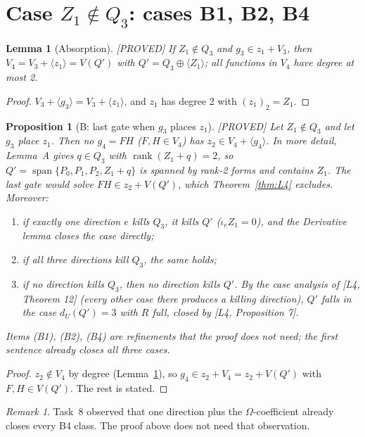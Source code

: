 \documentclass[11pt,a4paper]{article}
\theoremstyle{plain}
\newtheorem{lemma}[theorem]{Lemma}
\newtheorem{proposition}[theorem]{Proposition}
\theoremstyle{definition}
\theoremstyle{remark}
\newtheorem{remark}[theorem]{Remark}
\newcommand{\Span}{\operatorname{span}}
\newcommand{\rk}{\operatorname{rank}}
\newcommand{\dU}{d_U}
\newcommand{\status}[1]{\hfill\textsf{[#1]}}
\begin{document}
\section{Case $Z_1\notin Q_3$: cases B1, B2, B4}

\begin{lemma}[Absorption]\label{lem:abs}\status{PROVED}
If $Z_1\notin Q_3$ and $g_3\in z_1+V_3$, then $V_4=V_3+\langle z_1\rangle=V(Q')$ with $Q'=Q_3\oplus\langle Z_1\rangle$; all functions in $V_4$ have degree at most 2.
\end{lemma}

\begin{proof}
$V_3+\langle g_3\rangle=V_3+\langle z_1\rangle$, and $z_1$ has degree 2 with $(z_1)_2=Z_1$.
\end{proof}

\begin{proposition}[B: last gate when $g_3$ places $z_1$]\label{prop:B}\status{PROVED}
Let $Z_1\notin Q_3$ and let $g_3$ place $z_1$. Then no $g_4=FH$ ($F,H\in V_4$) has $z_2\in V_4+\langle g_4\rangle$. In more detail, Lemma~A gives $q\in Q_3$ with $\rk(Z_1+q)=2$, so $Q'=\Span\{P_0,P_1,P_2,Z_1+q\}$ is spanned by rank-2 forms and contains $Z_1$. The last gate would solve $FH\in z_2+V(Q')$, which Theorem~\ref{thm:L4} excludes. Moreover:
\begin{enumerate}[(B1)]
\item if exactly one direction $e$ kills $Q_3$, it kills $Q'$ ($\iota_eZ_1=0$), and the Derivative lemma closes the case directly;
\item if all three directions kill $Q_3$, the same holds;
\item[(B4)] if no direction kills $Q_3$, then no direction kills $Q'$. By the case analysis of [L4, Theorem 12] (every other case there produces a killing direction), $Q'$ falls in the case $\dU(Q')=3$ with $R$ full, closed by [L4, Proposition 7].
\end{enumerate}
Items (B1), (B2), (B4) are refinements that the proof does not need; the first sentence already closes all three cases.
\end{proposition}

\begin{proof}
$z_2\notin V_4$ by degree (Lemma~\ref{lem:abs}), so $g_4\in z_2+V_4=z_2+V(Q')$ with $F,H\in V(Q')$. The rest is stated.
\end{proof}

\begin{remark}
Task~8 observed that one direction plus the $\Omega$-coefficient already closes every B4 class. The proof above does not need that observation.
\end{remark}
\end{document}
